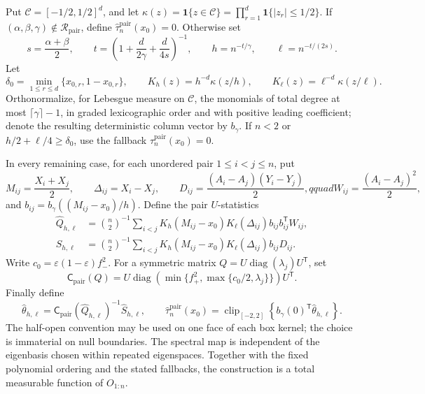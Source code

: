 Put \(\mathcal C=[-1/2,1/2]^d\), and let
\(\kappa(z)=\mathbf 1\{z\in\mathcal C\}=\prod_{r=1}^d
\mathbf 1\{|z_r|\leq1/2\}\).  If
\((\alpha,\beta,\gamma)\notin\mathcal R_{\mathrm{pair}}\), define
\(\widehat\tau_n^{\mathrm{pair}}(x_0)=0\).  Otherwise set
\[
s=\frac{\alpha+\beta}{2},\qquad
t=\left(1+\frac d{2\gamma}+\frac d{4s}\right)^{-1},
\qquad h=n^{-t/\gamma},\qquad \ell=n^{-t/(2s)}.
\]
Let
\[
\delta_0=\min_{1\leq r\leq d}\{x_{0,r},1-x_{0,r}\},
\qquad
K_h(z)=h^{-d}\kappa(z/h),
\qquad K_\ell(z)=\ell^{-d}\kappa(z/\ell).
\]
Orthonormalize, for Lebesgue measure on \(\mathcal C\), the monomials of
total degree at most \(\lceil\gamma\rceil-1\), in graded lexicographic order
and with positive leading coefficient; denote the resulting deterministic
column vector by \(b_\gamma\).  If \(n<2\) or
\(h/2+\ell/4\geq\delta_0\), use the fallback
\(\widehat\tau_n^{\mathrm{pair}}(x_0)=0\).

In every remaining case, for each unordered pair \(1\leq i<j\leq n\), put
\[
M_{ij}=\frac{X_i+X_j}{2},\qquad
\Delta_{ij}=X_i-X_j,
\qquad
D_{ij}=\frac{(A_i-A_j)(Y_i-Y_j)}2,qquad
W_{ij}=\frac{(A_i-A_j)^2}2,
\]
and \(b_{ij}=b_\gamma((M_{ij}-x_0)/h)\).  Define the pair
\(U\)-statistics
\[
\begin{aligned}
\widehat Q_{h,\ell}
&=\binom n2^{-1}\sum_{i<j}
K_h(M_{ij}-x_0)K_\ell(\Delta_{ij})
b_{ij}b_{ij}^{\mathsf T}W_{ij},\\
\widehat S_{h,\ell}
&=\binom n2^{-1}\sum_{i<j}
K_h(M_{ij}-x_0)K_\ell(\Delta_{ij})
b_{ij}D_{ij}.
\end{aligned}
\]
Write \(c_0=\varepsilon(1-\varepsilon)f_-^2\).  For a symmetric
matrix \(Q=U\operatorname{diag}(\lambda_j)U^{\mathsf T}\), set
\[
\mathsf C_{\mathrm{pair}}(Q)
=U\operatorname{diag}\!\left(
\min\{f_+^2,\max\{c_0/2,\lambda_j\}\}
\right)U^{\mathsf T}.
\]
Finally define
\[
\widehat\theta_{h,\ell}
=\mathsf C_{\mathrm{pair}}(\widehat Q_{h,\ell})^{-1}
\widehat S_{h,\ell},
\qquad
\widehat\tau_n^{\mathrm{pair}}(x_0)
=\operatorname{clip}_{[-2,2]}
\left\{b_\gamma(0)^{\mathsf T}\widehat\theta_{h,\ell}\right\}.
\]
The half-open convention may be used on one face of each box kernel; the
choice is immaterial on null boundaries.  The spectral map is independent of
the eigenbasis chosen within repeated eigenspaces.  Together with the fixed
polynomial ordering and the stated fallbacks, the construction is a total
measurable function of \(O_{1:n}\).
